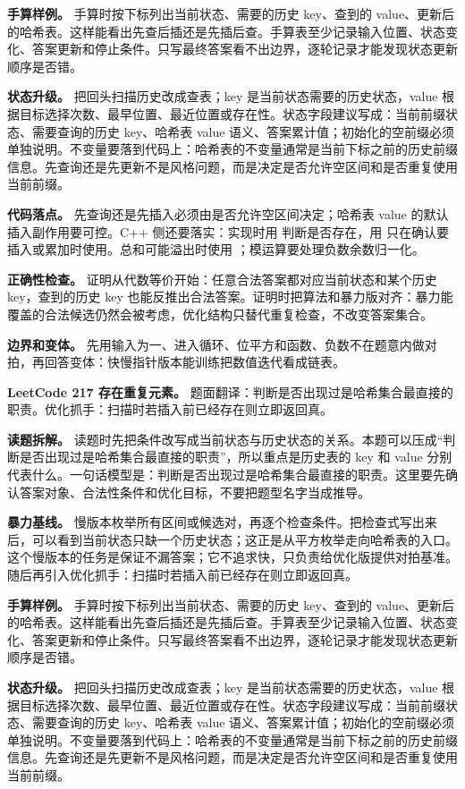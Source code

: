 \textbf{手算样例。} 手算时按下标列出当前状态、需要的历史 key、查到的 value、更新后的哈希表。这样能看出先查后插还是先插后查。手算表至少记录输入位置、状态变化、答案更新和停止条件。只写最终答案看不出边界，逐轮记录才能发现状态更新顺序是否错。

\textbf{状态升级。} 把回头扫描历史改成查表；key 是当前状态需要的历史状态，value 根据目标选择次数、最早位置、最近位置或存在性。状态字段建议写成：当前前缀状态、需要查询的历史 key、哈希表 value 语义、答案累计值；初始化的空前缀必须单独说明。不变量要落到代码上：哈希表的不变量通常是当前下标之前的历史前缀信息。先查询还是先更新不是风格问题，而是决定是否允许空区间和是否重复使用当前前缀。

\textbf{代码落点。} 先查询还是先插入必须由是否允许空区间决定；哈希表 value 的默认插入副作用要可控。C++ 侧还要落实：实现时用  判断是否存在，用  只在确认要插入或累加时使用。总和可能溢出时使用 ；模运算要处理负数余数归一化。

\textbf{正确性检查。} 证明从代数等价开始：任意合法答案都对应当前状态和某个历史 key，查到的历史 key 也能反推出合法答案。证明时把算法和暴力版对齐：暴力能覆盖的合法候选仍然会被考虑，优化结构只替代重复检查，不改变答案集合。

\textbf{边界和变体。} 先用输入为一、进入循环、位平方和函数、负数不在题意内做对拍，再回答变体：快慢指针版本能训练把数值迭代看成链表。

\noindent\textbf{LeetCode 217 存在重复元素。} 题面翻译：判断是否出现过是哈希集合最直接的职责。优化抓手：扫描时若插入前已经存在则立即返回真。

\textbf{读题拆解。} 读题时先把条件改写成当前状态与历史状态的关系。本题可以压成“判断是否出现过是哈希集合最直接的职责”，所以重点是历史表的 key 和 value 分别代表什么。一句话模型是：判断是否出现过是哈希集合最直接的职责。这里要先确认答案对象、合法性条件和优化目标，不要把题型名字当成推导。

\textbf{暴力基线。} 慢版本枚举所有区间或候选对，再逐个检查条件。把检查式写出来后，可以看到当前状态只缺一个历史状态；这正是从平方枚举走向哈希表的入口。这个慢版本的任务是保证不漏答案；它不追求快，只负责给优化版提供对拍基准。随后再引入优化抓手：扫描时若插入前已经存在则立即返回真。

\textbf{手算样例。} 手算时按下标列出当前状态、需要的历史 key、查到的 value、更新后的哈希表。这样能看出先查后插还是先插后查。手算表至少记录输入位置、状态变化、答案更新和停止条件。只写最终答案看不出边界，逐轮记录才能发现状态更新顺序是否错。

\textbf{状态升级。} 把回头扫描历史改成查表；key 是当前状态需要的历史状态，value 根据目标选择次数、最早位置、最近位置或存在性。状态字段建议写成：当前前缀状态、需要查询的历史 key、哈希表 value 语义、答案累计值；初始化的空前缀必须单独说明。不变量要落到代码上：哈希表的不变量通常是当前下标之前的历史前缀信息。先查询还是先更新不是风格问题，而是决定是否允许空区间和是否重复使用当前前缀。

